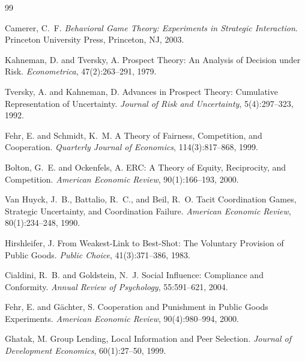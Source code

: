 \documentclass[11pt,a4paper]{article}
\theoremstyle{definition}
\theoremstyle{remark}
\begin{document}
\begin{thebibliography}{99}

Camerer, C.~F.
\newblock \emph{Behavioral Game Theory: Experiments in Strategic
  Interaction}.
\newblock Princeton University Press, Princeton, NJ, 2003.

Kahneman, D. and Tversky, A.
\newblock Prospect Theory: An Analysis of Decision under Risk.
\newblock \emph{Econometrica}, 47(2):263--291, 1979.

Tversky, A. and Kahneman, D.
\newblock Advances in Prospect Theory: Cumulative Representation
  of Uncertainty.
\newblock \emph{Journal of Risk and Uncertainty}, 5(4):297--323, 1992.

Fehr, E. and Schmidt, K.~M.
\newblock A Theory of Fairness, Competition, and Cooperation.
\newblock \emph{Quarterly Journal of Economics}, 114(3):817--868, 1999.

Bolton, G.~E. and Ockenfels, A.
\newblock ERC: A Theory of Equity, Reciprocity, and Competition.
\newblock \emph{American Economic Review}, 90(1):166--193, 2000.

Van Huyck, J.~B., Battalio, R.~C., and Beil, R.~O.
\newblock Tacit Coordination Games, Strategic Uncertainty, and
  Coordination Failure.
\newblock \emph{American Economic Review}, 80(1):234--248, 1990.

Hirshleifer, J.
\newblock From Weakest-Link to Best-Shot: The Voluntary Provision
  of Public Goods.
\newblock \emph{Public Choice}, 41(3):371--386, 1983.

Cialdini, R.~B. and Goldstein, N.~J.
\newblock Social Influence: Compliance and Conformity.
\newblock \emph{Annual Review of Psychology}, 55:591--621, 2004.

Fehr, E. and G\"achter, S.
\newblock Cooperation and Punishment in Public Goods Experiments.
\newblock \emph{American Economic Review}, 90(4):980--994, 2000.

Ghatak, M.
\newblock Group Lending, Local Information and Peer Selection.
\newblock \emph{Journal of Development Economics}, 60(1):27--50, 1999.


\end{thebibliography}
\end{document}
